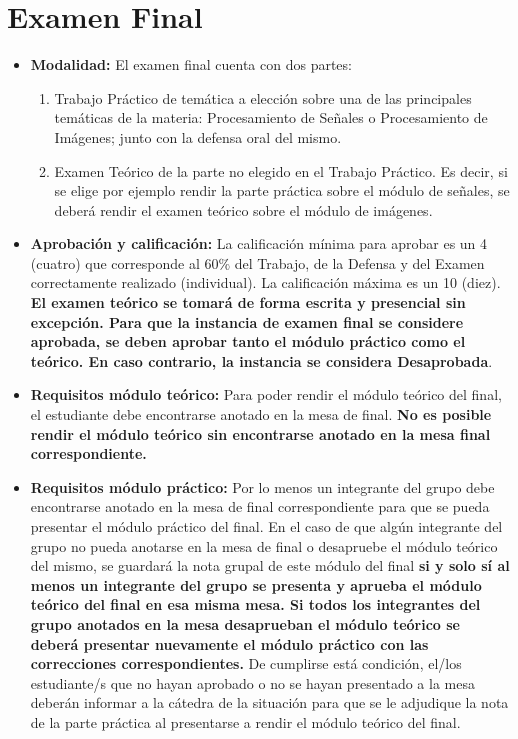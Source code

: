 \documentclass[10pt]{article}
\begin{document}
\section{Examen Final}\label{sec:ex_final}
\begin{itemize}
    \item \textbf{Modalidad:} El examen final cuenta con dos partes:

    \begin{enumerate}
        \item Trabajo Práctico de temática a elección sobre una de las principales temáticas de la materia: Procesamiento de Señales o Procesamiento de Imágenes; junto con la defensa oral del mismo.
        \item Examen Teórico de la parte no elegido en el Trabajo Práctico. Es decir, si se elige por ejemplo rendir la parte práctica sobre el módulo de señales, se deberá rendir el examen teórico sobre el módulo de imágenes. 
    \end{enumerate}
    
    
    
    \item \textbf{Aprobación y calificación: } La calificación mínima para aprobar es un 4 (cuatro) que corresponde al $60\%$ del Trabajo, de la Defensa y del Examen correctamente realizado (individual). La calificación máxima es un 10 (diez). \textbf{El examen teórico se tomará de forma escrita y presencial sin excepción. Para que la instancia de examen final se considere aprobada, se deben aprobar tanto el módulo práctico como el teórico. En caso contrario, la instancia se considera Desaprobada}. 

    \item \textbf{Requisitos módulo teórico: } Para poder rendir el módulo teórico del final, el estudiante debe encontrarse anotado en la mesa de final. \textbf{No es posible rendir el módulo teórico sin encontrarse anotado en la mesa final correspondiente.}

    \item \textbf{Requisitos módulo práctico: } Por lo menos un integrante del grupo debe encontrarse anotado en la mesa de final correspondiente para que se pueda presentar el módulo práctico del final. En el caso de que algún integrante del grupo no pueda anotarse en la mesa de final o desapruebe el módulo teórico del mismo, se guardará la nota grupal de este módulo del final \textbf{si y solo sí al menos un integrante del grupo se presenta y aprueba el módulo teórico del final en esa misma mesa. Si todos los integrantes del grupo anotados en la mesa desaprueban el módulo teórico se deberá presentar nuevamente el módulo práctico con las correcciones correspondientes.} De cumplirse está condición, el/los estudiante/s que no hayan aprobado o no se hayan presentado a la mesa deberán informar a la cátedra de la situación para que se le adjudique la nota de la parte práctica al presentarse a rendir el módulo teórico del final.
    

\end{itemize}
\end{document}
